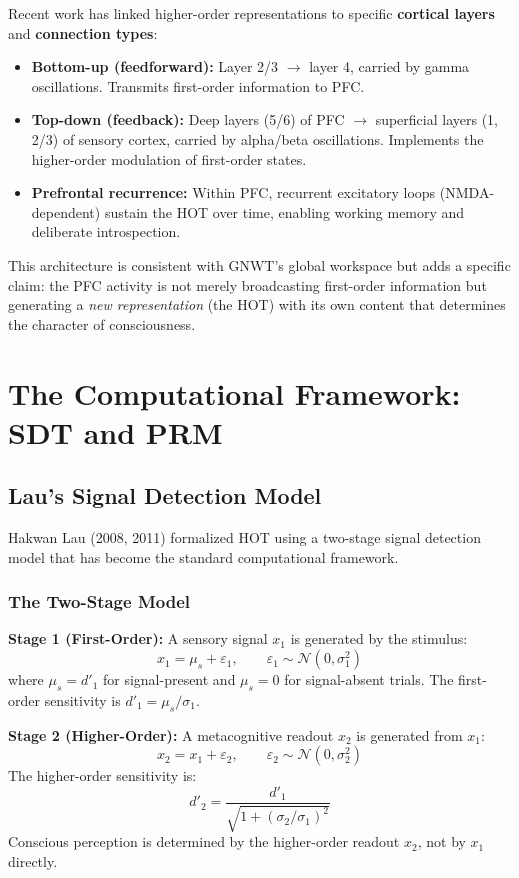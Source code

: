 \documentclass[11pt,a4paper]{report}
\begin{document}
Recent work has linked higher-order representations to specific \textbf{cortical layers} and \textbf{connection types}:

\begin{itemize}[leftmargin=1.5em]
  \item \textbf{Bottom-up (feedforward):} Layer 2/3 $\to$ layer 4, carried by gamma oscillations. Transmits first-order information to PFC.
  \item \textbf{Top-down (feedback):} Deep layers (5/6) of PFC $\to$ superficial layers (1, 2/3) of sensory cortex, carried by alpha/beta oscillations. Implements the higher-order modulation of first-order states.
  \item \textbf{Prefrontal recurrence:} Within PFC, recurrent excitatory loops (NMDA-dependent) sustain the HOT over time, enabling working memory and deliberate introspection.
\end{itemize}

This architecture is consistent with GNWT's global workspace but adds a specific claim: the PFC activity is not merely broadcasting first-order information but generating a \emph{new representation} (the HOT) with its own content that determines the character of consciousness.


\chapter{The Computational Framework: SDT and PRM}

\section{Lau's Signal Detection Model}

Hakwan Lau (2008, 2011) formalized HOT using a two-stage signal detection model that has become the standard computational framework.

\subsection{The Two-Stage Model}

\begin{principlebox}
\textbf{Stage 1 (First-Order):} A sensory signal $x_1$ is generated by the stimulus:
\[
  x_1 = \mu_s + \varepsilon_1, \qquad \varepsilon_1 \sim \mathcal{N}(0, \sigma_1^2)
\]
where $\mu_s = d'_1$ for signal-present and $\mu_s = 0$ for signal-absent trials. The first-order sensitivity is $d'_1 = \mu_s / \sigma_1$.

\textbf{Stage 2 (Higher-Order):} A metacognitive readout $x_2$ is generated from $x_1$:
\[
  x_2 = x_1 + \varepsilon_2, \qquad \varepsilon_2 \sim \mathcal{N}(0, \sigma_2^2)
\]
The higher-order sensitivity is:
\[
  d'_2 = \frac{d'_1}{\sqrt{1 + (\sigma_2/\sigma_1)^2}}
\]
Conscious perception is determined by the higher-order readout $x_2$, not by $x_1$ directly.
\end{principlebox}
\end{document}
